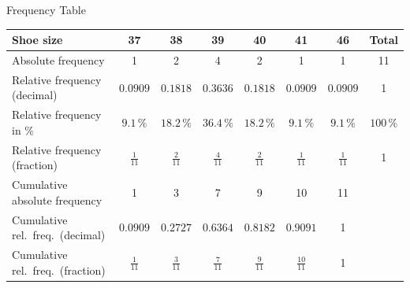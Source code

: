 \documentclass[aspectratio=169,11pt]{beamer}
\begin{document}
\begin{frame}{Frequency Table}
  \begin{center}
    \small\renewcommand{\arraystretch}{1.2}
    \begin{tabular}{lccccccc}
      \toprule
      Shoe size & 37 & 38 & 39 & 40 & 41 & 46 & Total \\
      \midrule
      Absolute frequency & 1 & 2 & 4 & 2 & 1 & 1 & 11 \\
      Relative frequency (decimal) & $0.0909$ & $0.1818$ & $0.3636$ & $0.1818$ & $0.0909$ & $0.0909$ & 1 \\
      Relative frequency in \% & $9.1\,\%$ & $18.2\,\%$ & $36.4\,\%$ & $18.2\,\%$ & $9.1\,\%$ & $9.1\,\%$ & $100\,\%$ \\
      Relative frequency (fraction) & $\tfrac{1}{11}$ & $\tfrac{2}{11}$ & $\tfrac{4}{11}$ & $\tfrac{2}{11}$ & $\tfrac{1}{11}$ & $\tfrac{1}{11}$ & 1 \\
      Cumulative absolute frequency & 1 & 3 & 7 & 9 & 10 & 11 & \\
      Cumulative rel.\ freq.\ (decimal) & $0.0909$ & $0.2727$ & $0.6364$ & $0.8182$ & $0.9091$ & 1 & \\
      Cumulative rel.\ freq.\ (fraction) & $\tfrac{1}{11}$ & $\tfrac{3}{11}$ & $\tfrac{7}{11}$ & $\tfrac{9}{11}$ & $\tfrac{10}{11}$ & 1 & \\
      \bottomrule
    \end{tabular}
  \end{center}
\end{frame}
\end{document}
